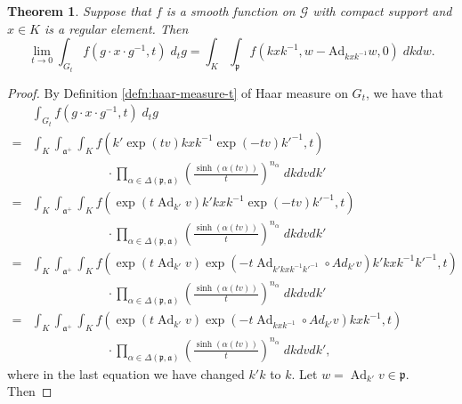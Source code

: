 \documentclass{amsproc}
\newtheorem{theorem}{Theorem}[section]
\theoremstyle{definition}
\theoremstyle{remark}
\numberwithin{equation}{section}
\DeclareMathOperator{\Ad}{Ad}
\newcommand{\ka}{\mathfrak{a}}
\newcommand{\kp}{\mathfrak{p}}
\begin{document}
\begin{theorem}
\label{main thm}
Suppose that $f$ is a smooth  function on $\mathcal{G}$ with compact support and $x \in K$ is a regular element.  Then 
\[
\lim_{t \to 0} \int_{G_t} f(g \cdot x \cdot  g^{-1}, t) \; d_t g = \int_K  \int_\kp f\left(kx k^{-1}, w-\text{Ad}_{kx k^{-1}}   w , 0\right ) \; dk dw .
\]
\end{theorem}

\begin{proof}
By Definition \ref{defn:haar-measure-t} of Haar measure on $G_t$, we have that 
\[
\begin{aligned}
&\int_{G_t} f(g \cdot x \cdot  g^{-1}, t) \; d_t g \\
=& \int_K \int_{\ka^+} \int_K 
f\left(k'\exp(tv)kx k^{-1} \exp(-tv)k'^{-1}, t\right ) \\
&\qquad \qquad \qquad \cdot \prod_{\alpha \in \Delta(\kp, \ka)} \left(\frac{\sinh(\alpha(tv))}{t}\right)^{n_\alpha}\; dk dvdk'\\
=& \int_K \int_{\ka^+} \int_K 
f\left(\exp(t \Ad_{k'}v)k'kx k^{-1} \exp(-tv)k'^{-1}, t\right ) \\
&\qquad \qquad \qquad \cdot \prod_{\alpha \in \Delta(\kp, \ka)} \left(\frac{\sinh(\alpha(tv))}{t}\right)^{n_\alpha}\; dk dvdk'\\
=& \int_K \int_{\ka^+} \int_K 
f\left(\exp(t \Ad_{k'}v)\exp(-t\Ad_{k'kx k^{-1} k'^{-1}}\circ Ad_{k'}v)k'kx k^{-1} k'^{-1}, t\right ) \\
&\qquad \qquad \qquad \cdot  \prod_{\alpha \in \Delta(\kp, \ka)} \left(\frac{\sinh(\alpha(tv))}{t}\right)^{n_\alpha}\; dk dvdk'\\
=& \int_K \int_{\ka^+} \int_K 
f\left(\exp(t \Ad_{k'}v)\exp(-t\Ad_{kx k^{-1}}\circ Ad_{k'}v)kx k^{-1} , t\right ) \\
&\qquad \qquad \qquad \cdot \prod_{\alpha \in \Delta(\kp, \ka)} \left(\frac{\sinh(\alpha(tv))}{t}\right)^{n_\alpha}\; dk dvdk',
\end{aligned}
\]	
where in the last equation we have changed $k'k$ to $k$. Let $w = \Ad_{k'}v \in \kp$. Then 


\end{proof}
\end{document}
